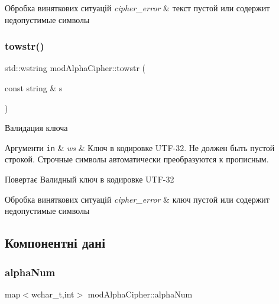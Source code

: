 \begin{DoxyExceptions}{Обробка виняткових ситуацій}
{\em cipher\+\_\+error} & текст пустой или содержит недопустимые символы \\
\hline
\end{DoxyExceptions}
\mbox{\label{classmodAlphaCipher_abe2b4d4ac6d40a1e1fec64953f047594}} 
\subsubsection{\texorpdfstring{towstr()}{towstr()}}
{\footnotesize\ttfamily std\+::wstring mod\+Alpha\+Cipher\+::towstr (\begin{DoxyParamCaption}\item[{const string \&}]{s }\end{DoxyParamCaption})\hspace{0.3cm}{\ttfamily [private]}}



Валидация ключа 


\begin{DoxyParams}[1]{Аргументи}
\mbox{\tt in}  & {\em ws} & Ключ в кодировке U\+T\+F-\/32. Не должен быть пустой строкой. Строчные символы автоматически преобразуются к прописным. \\
\hline
\end{DoxyParams}
\begin{DoxyReturn}{Повертає}
Валидный ключ в кодировке U\+T\+F-\/32 
\end{DoxyReturn}

\begin{DoxyExceptions}{Обробка виняткових ситуацій}
{\em cipher\+\_\+error} & ключ пустой или содержит недопустимые символы \\
\hline
\end{DoxyExceptions}


\subsection{Компонентні дані}
\mbox{\label{classmodAlphaCipher_a9f0ca70558be9e08474f544aeaac55d8}} 
\subsubsection{\texorpdfstring{alpha\+Num}{alphaNum}}
{\footnotesize\ttfamily map$<$wchar\+\_\+t,int$>$ mod\+Alpha\+Cipher\+::alpha\+Num\hspace{0.3cm}{\ttfamily [private]}}



